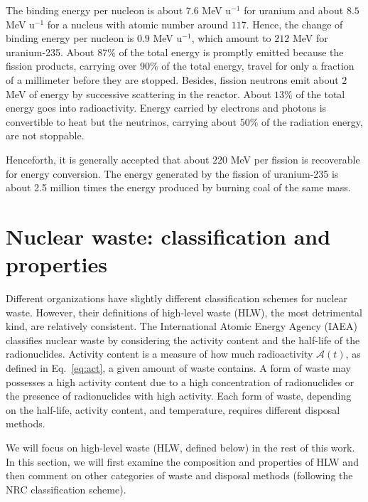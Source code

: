 \documentclass[nofootinbib,preprint,aip,pra]{revtex4-1}
\begin{document}
        The binding energy per nucleon is about $7.6$ MeV u${}^{-1}$ for uranium and about $8.5$ MeV u${}^{-1}$
        for a nucleus with atomic number around $117$. Hence, the change of binding energy per nucleon is
        $0.9$ MeV u${}^{-1}$, which amount to $212$ MeV for uranium-235.
        About $87\%$ of the total energy is promptly emitted because
        the fission products, carrying over $90\%$ of the total energy, travel for only a fraction of a
        millimeter before they are stopped. Besides, fission neutrons emit about $2$ MeV of energy by
        successive scattering in the reactor.
        About $13\%$ of the total energy goes into radioactivity. Energy carried by electrons and photons is
        convertible to heat but the neutrinos, carrying about $50\%$ of the radiation energy, are not stoppable.

        Henceforth, it is generally accepted that about $220$ MeV per fission is recoverable for energy conversion.
        The energy generated by the fission of uranium-235 is 
        about 2.5 million times the energy produced by burning coal of the same mass.\cite{e17}

\section{Nuclear waste: classification and properties}
\label{sec:waste}
    Different organizations have slightly different classification schemes for nuclear waste.
    However, their definitions of high-level waste (HLW), the most detrimental kind, are relatively consistent.
    The International Atomic Energy Agency (IAEA) classifies nuclear waste by considering the activity
    content and the half-life of the radionuclides.
    Activity content is a measure of how much radioactivity $\mathcal{A}(t)$, as defined in Eq.~\ref{eq:act},
    a given amount of waste contains.
    A form of waste may possesses a high activity content due to
    a high concentration of radionuclides or the presence of radionuclides with high activity.\cite{iaea09}
    Each form of waste, depending on the half-life, activity content, and temperature, requires different
    disposal methods.

    We will focus on high-level waste (HLW, defined below) in the rest of this work.
    In this section, we will first examine the composition and properties of HLW and then
    comment on other categories of waste and disposal methods (following the NRC classification scheme). 
\end{document}
